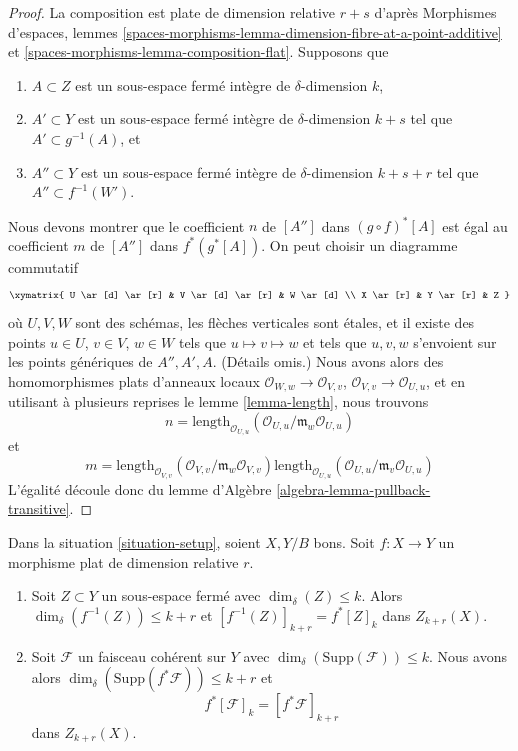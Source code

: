 \begin{proof}
La composition est plate de dimension relative $r + s$ d'après Morphismes
d'espaces, lemmes
\ref{spaces-morphisms-lemma-dimension-fibre-at-a-point-additive} et
\ref{spaces-morphisms-lemma-composition-flat}. Supposons que
\begin{enumerate}
\item $A \subset Z$ est un sous-espace fermé intègre de $\delta$-dimension
$k$,
\item $A' \subset Y$ est un sous-espace fermé intègre de $\delta$-dimension
$k + s$ tel que $A' \subset g^{-1}(A)$, et
\item $A'' \subset Y$ est un sous-espace fermé intègre de $\delta$-dimension
$k + s + r$ tel que $A'' \subset f^{-1}(W')$.
\end{enumerate}
Nous devons montrer que le coefficient $n$ de $[A'']$ dans $(g \circ f)^*[A]$
est égal au coefficient $m$ de $[A'']$ dans $f^*(g^*[A])$. On peut
choisir un diagramme commutatif
$$
\xymatrix{
U \ar[d] \ar[r] & V \ar[d] \ar[r] & W \ar[d] \\
X \ar[r] & Y \ar[r] & Z
}
$$
où $U, V, W$ sont des schémas, les flèches verticales sont \'etales, et il
existe des points $u \in U$, $v \in V$, $w \in W$ tels que $u \mapsto v
\mapsto w$ et tels que $u, v, w$ s'envoient sur les points génériques de $A'',
A', A$. (Détails omis.) Nous avons alors des homomorphismes plats d'anneaux
locaux $\mathcal{O}_{W, w} \to \mathcal{O}_{V, v}$, $\mathcal{O}_{V, v} \to
\mathcal{O}_{U, u}$, et en utilisant à plusieurs reprises le lemme
\ref{lemma-length}, nous trouvons
$$
n = \text{length}_{\mathcal{O}_{U, u}}(
\mathcal{O}_{U, u}/\mathfrak m_w\mathcal{O}_{U, u})
$$
et
$$
m =
\text{length}_{\mathcal{O}_{V, v}}(
\mathcal{O}_{V, v}/\mathfrak m_w\mathcal{O}_{V, v})
\text{length}_{\mathcal{O}_{U, u}}(
\mathcal{O}_{U, u}/\mathfrak m_v\mathcal{O}_{U, u})
$$
L'égalité découle donc du lemme d'Algèbre
\ref{algebra-lemma-pullback-transitive}.
\end{proof}

\begin{lemma}
\label{lemma-pullback-coherent}
Dans la situation \ref{situation-setup}, soient $X, Y/B$ bons. Soit $f :
X \to Y$ un morphisme plat de dimension relative $r$.
\begin{enumerate}
\item Soit $Z \subset Y$ un sous-espace fermé avec $\dim_\delta(Z) \leq k$.
Alors $\dim_\delta(f^{-1}(Z)) \leq k + r$ et $[f^{-1}(Z)]_{k +
r} = f^*[Z]_k$ dans $Z_{k + r}(X)$.
\item Soit $\mathcal{F}$ un faisceau cohérent sur $Y$ avec
$\dim_\delta(\text{Supp}(\mathcal{F})) \leq k$. Nous avons alors
$\dim_\delta(\text{Supp}(f^*\mathcal{F})) \leq k + r$ et
$$
f^*[{\mathcal F}]_k = [f^*{\mathcal F}]_{k+r}
$$
dans $Z_{k + r}(X)$.
\end{enumerate}
\end{lemma}

